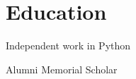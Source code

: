\documentclass[letterpaper]{deedy-resume} %
\begin{document}
\begin{minipage}[t]{0.33\textwidth}
\section{Education}

Independent work in Python \\

\vspace{0.5\baselineskip}

Alumni Memorial Scholar \\



\end{minipage} %
\hfill
%
%
\end{document}
